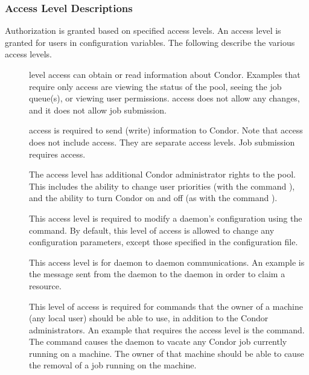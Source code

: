 \subsubsection{\label{sec:Security-access-levels} Access Level Descriptions}
Authorization is granted based on specified access levels.
An access level is granted for users in configuration variables.
The following describe the various access levels.

\begin{description}

\item[] \label{dcperm:read}  level
   access can obtain or read information about Condor.
   Examples that require only  access are
   viewing the status of the pool, seeing the job queue(s),
   or viewing user permissions.
    access does not allow any
   changes, and it does not allow job submission.

\item[] \label{dcperm:write}  access
   is required to send (write) information to Condor.
   Note that  access does not include  access.
   They are separate access levels.
   Job submission requires  access.

\item[] \label{dcperm:administrator} The
    access level has additional Condor
   administrator rights to the pool.  This includes the ability to
   change user priorities (with the command ),
   and the ability to turn Condor on and off
   (as with the command ).

\item[] \label{dcperm:config} This access level is
   required to modify a daemon's configuration using
   the  command.
   By default, this level of access is allowed
   to change any configuration parameters, except those specified in
   the  configuration file.

\item[] \label{dcperm:config} 
   This access level is for daemon to daemon communications.
   An example is the message sent from the  daemon
   to the  daemon in order to claim a resource.

\item[] \label{dcperm:owner} This level of access is
   required for commands that the owner of a machine (any local user)
   should be able to use, in addition to the Condor administrators.
   An example that requires the  access level is
   the  command.
   The command causes the  daemon to vacate any
   Condor job currently running on a machine.
   The owner of that machine should be able to cause the removal
   of a job running on the machine.


\end{description}
